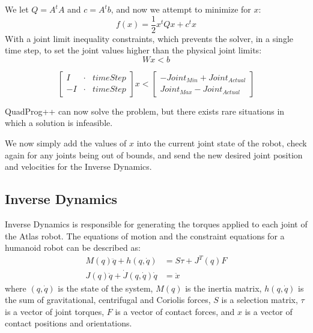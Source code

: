 \documentclass[12pt]{report}
\begin{document}
We let $Q=A^tA$ and $c=A^tb$, and now we attempt to minimize for $x$:  
\begin{equation} 
f(x) = \frac{1}{2}x^tQx + c^tx 
\end{equation}
With a joint limit inequality constraints, which prevents the solver, in a single time step, to set the joint values higher than the physical joint limits:
\begin{equation} 
Wx<b
\end{equation}

\begin{equation} 
\begin{bmatrix}
I &\cdot & timeStep \\
-I &\cdot & timeStep 
\end{bmatrix}
x
< 
\begin{bmatrix}
-Joint_{Min} + {Joint}_{Actual} \\
Joint_{Max} - {Joint}_{Actual}
\end{bmatrix}
\end{equation}

QuadProg++ can now solve the problem, but there exists rare situations in which a solution is infeasible. 

We now simply add the values of $x$ into the current joint state of the robot, check again for any joints being out of bounds, and send the new desired joint position and velocities for the Inverse Dynamics.

\subsection{Inverse Dynamics}
Inverse Dynamics is responsible for generating the torques applied to each joint of the Atlas robot. The equations of motion and the constraint equations for a humanoid robot can be described as:
\vspace{-5pt}
\begin{equation} \label{eq2}
\begin{split}
M(q)\ddot q + h(q,\dot q) &= S\tau + J^T(q)F\\
J(q)\ddot q + \dot J(q,\dot q)\dot q & = \ddot x
\end{split}
\end{equation}
where $(q,\dot {q})$ is the state of the system, $M(q)$ is the inertia matrix, $h(q,\dot q)$ is the sum of gravitational, centrifugal and Coriolis forces, $S$ is a selection matrix, $\tau$ is a vector of joint torques, $F$ is a vector of contact forces, and $x$ is a vector of contact positions and orientations.
\end{document}
